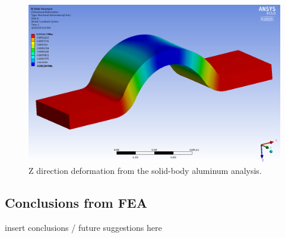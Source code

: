 \begin{figure}[htp]
\centering
\includegraphics[width=1\textwidth]{./figures/fea/fea-solid-al-def-z}
\caption{Z direction deformation from the solid-body aluminum analysis.}
\label{fig:fea-solid-al-def-z}
\end{figure}

\clearpage

\subsection{Conclusions from FEA}

insert conclusions / future suggestions here

\clearpage

